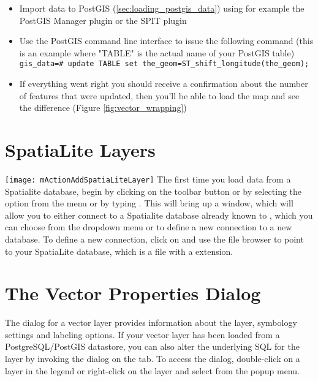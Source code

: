 
\begin{itemize}[label=--]
\item Import data to PostGIS (\ref{sec:loading_postgis_data}) using for
example the PostGIS Manager plugin or the SPIT plugin
\item Use the PostGIS command line interface to issue the following command
(this is an example where "TABLE" is the actual name of your PostGIS table) \\ 
\texttt{gis\_data=\# update TABLE set the\_geom=ST\_shift\_longitude(the\_geom);} 
\item If everything went right you should receive a confirmation about the
number of features that were updated, then you'll be able to load the map and
see the difference (Figure \ref{fig:vector_wrapping})
\end{itemize}

\section{SpatiaLite Layers} 
\label{label_spatialite} 

\texttt{[image: mActionAddSpatiaLiteLayer]}
The first time you load data from a Spatialite database, begin by clicking on the 
 toolbar button or by selecting the 
option from the  menu or by typing . 
This will bring up a window, which will allow you to either connect to a Spatialite database already known to \qg, which 
you can choose from the dropdown menu or to define a new connection to a new database. To define a new connection, 
click on  and use the file browser to point to your SpatiaLite database, 
which is a file with a  extension.

\section{The Vector Properties Dialog}\label{sec:vectorprops}

The  dialog for a vector layer provides information
about the layer, symbology settings and labeling options. If your vector
layer has been loaded from a PostgreSQL/PostGIS datastore, you can also alter
the underlying SQL for the layer by invoking the 
dialog on the  tab. 
To access the  dialog, double-click on a layer in
the legend or right-click on the layer and select 
from the popup menu.

